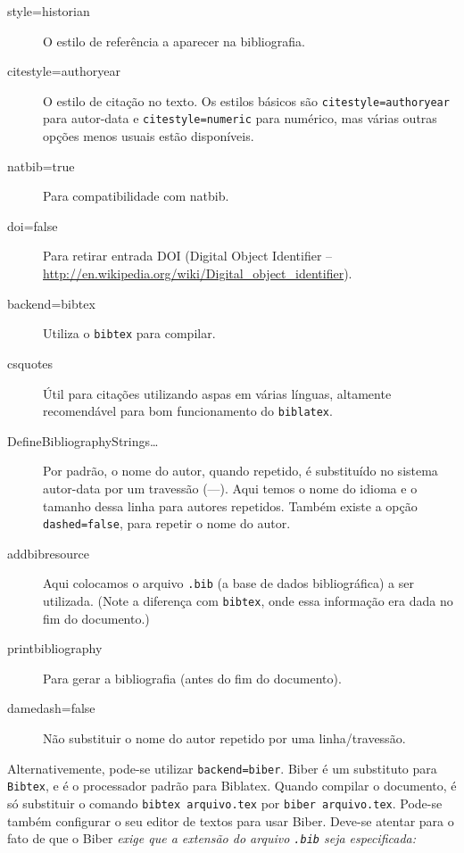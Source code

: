 \begin{description}
\item[style=historian] O estilo de referência a aparecer na bibliografia.
\item[citestyle=authoryear] O estilo de citação no texto. Os estilos básicos são \texttt{citestyle=authoryear} para autor-data e \texttt{citestyle=numeric} para numérico, mas várias outras opções menos usuais estão disponíveis.
\item[natbib=true] Para compatibilidade com natbib.
\item[doi=false] Para retirar entrada \textsc{DOI} (Digital Object Identifier -- \url{http://en.wikipedia.org/wiki/Digital_object_identifier}).
\item[backend=bibtex] Utiliza o \texttt{bibtex} para compilar.
\item[csquotes] Útil para citações utilizando aspas em várias línguas, altamente recomendável para bom funcionamento do \texttt{biblatex}.
\item[DefineBibliographyStrings\ldots] Por padrão, o nome do autor, quando repetido, é substituído no sistema autor-data por um travessão (---). Aqui temos o nome do idioma e o tamanho dessa linha para autores repetidos. Também existe a opção \texttt{dashed=false}, para repetir o nome do autor.
\item[addbibresource] Aqui colocamos o arquivo \texttt{.bib} (a base de dados bibliográfica) a ser utilizada. (Note a diferença com \texttt{bibtex}, onde essa informação era dada no fim do documento.)
\item[printbibliography] Para gerar a bibliografia (antes do fim do documento).
\item[damedash=false] Não substituir o nome do autor repetido por uma linha/travessão.
\end{description}

Alternativemente, pode-se utilizar \texttt{backend=biber}. \textsf{Biber} é um substituto para \texttt{Bibtex}, e é o processador padrão para \textsf{Biblatex}. Quando compilar o documento, é só substituir o comando \verb+bibtex arquivo.tex+ por \verb+biber arquivo.tex+. Pode-se também configurar o seu editor de textos para usar \textsf{Biber}. Deve-se atentar para o fato de que o \textsf{Biber} \textit{exige que a extensão do arquivo \texttt{.bib} seja especificada:}

\begin{verbatim}

\end{verbatim}

